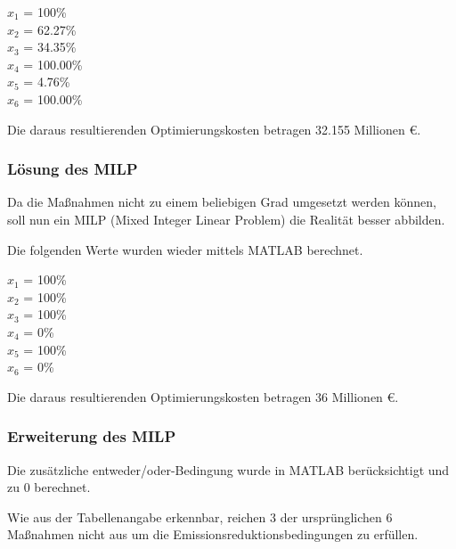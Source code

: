 \documentclass{eegreport}
\begin{document}
\begin{center}
\parbox{9cm}{
$x_1$ = 100\%\\
$x_2$ = 62.27\%\\
$x_3$ = 34.35\%\\
$x_4$ = 100.00\%\\
$x_5$ = 4.76\%\\
$x_6$ = 100.00\%
}
\end{center}

Die daraus resultierenden Optimierungskosten betragen 32.155 Millionen €. 

\subsubsection{Lösung des MILP}
Da die Maßnahmen nicht zu einem beliebigen Grad umgesetzt werden können, soll nun ein MILP (Mixed Integer Linear Problem) die Realität besser abbilden.

Die folgenden Werte wurden wieder mittels MATLAB berechnet.

\begin{center}
\parbox{9cm}{
$x_1$ = 100\%\\
$x_2$ = 100\%\\
$x_3$ = 100\%\\
$x_4$ = 0\%\\
$x_5$ = 100\%\\
$x_6$ = 0\%
}
\end{center}

Die daraus resultierenden Optimierungskosten betragen 36 Millionen €. 

\subsubsection{Erweiterung des MILP}
Die zusätzliche entweder/oder-Bedingung wurde in MATLAB berücksichtigt und zu 0 berechnet. 

Wie aus der Tabellenangabe erkennbar, reichen 3 der ursprünglichen 6 Maßnahmen nicht aus um die Emissionsreduktionsbedingungen zu erfüllen.
\newpage
\appendix


\newpage

\listoffigures   
\listoftables
\end{document}
